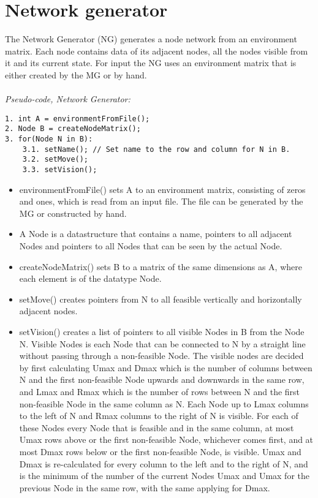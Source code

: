\section{Network generator}
The Network Generator (NG) generates a node network from an environment matrix. Each node contains data of its adjacent nodes, all the nodes visible from it and its current state. For input the NG uses an environment matrix that is either created by the MG or by hand.\\
\\
\noindent \emph{Pseudo-code, Network Generator:}
\begin{verbatim}
1. int A = environmentFromFile();
2. Node B = createNodeMatrix();
3. for(Node N in B):
    3.1. setName(); // Set name to the row and column for N in B.
    3.2. setMove();
    3.3. setVision();
\end{verbatim}
\begin{itemize}
\item environmentFromFile() sets A to an environment matrix, consisting of zeros and ones, which is read from an input file. The file can be generated by the MG or constructed by hand.
\item A Node is a datastructure that contains a name, pointers to all adjacent Nodes and pointers to all Nodes that can be seen by the actual Node.
\item createNodeMatrix() sets B to a matrix of the same dimensions as A, where each element is of the datatype Node.
\item setMove() creates pointers from N to all feasible vertically and horizontally adjacent nodes.
\item setVision() creates a list of pointers to all visible Nodes in B from the Node N. Visible Nodes is each Node that can be connected to N by a straight line without passing through a non-feasible Node. The visible nodes are decided by first calculating Umax and Dmax which is the number of columns between N and the first non-feasible Node upwards and downwards in the same row, and Lmax and Rmax which is the number of rows between N and the first non-feasible Node in the same column as N. Each Node up to Lmax columns to the left of N and Rmax columns to the right of N is visible. For each of these Nodes every Node that is feasible and in the same column, at most Umax rows above or the first non-feasible Node, whichever comes first, and at most Dmax rows below or the first non-feasible Node, is visible. Umax and Dmax is re-calculated for every column to the left and to the right of N, and is the minimum of the number of the current Nodes Umax and Umax for the previous Node in the same row, with the same applying for Dmax.
\end{itemize}